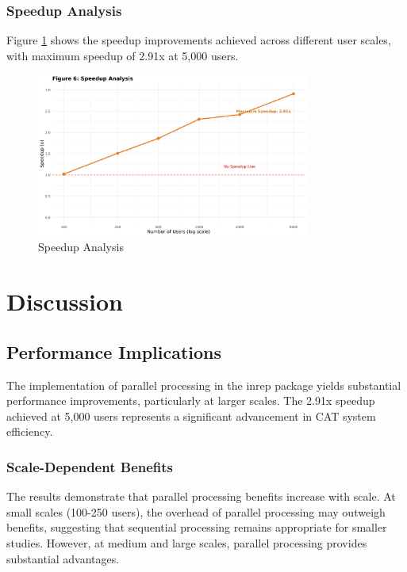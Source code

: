 \documentclass[11pt]{article}
\begin{document}
\subsubsection{Speedup Analysis}

Figure \ref{fig:speedup} shows the speedup improvements achieved across different user scales, with maximum speedup of 2.91x at 5,000 users.

\begin{figure}[H]
\centering
\includegraphics[width=0.8\textwidth]{Figure6_Speedup_Analysis.png}
\caption{Speedup Analysis}
\label{fig:speedup}
\end{figure}

\section{Discussion}

\subsection{Performance Implications}

The implementation of parallel processing in the inrep package yields substantial performance improvements, particularly at larger scales. The 2.91x speedup achieved at 5,000 users represents a significant advancement in CAT system efficiency.

\subsubsection{Scale-Dependent Benefits}

The results demonstrate that parallel processing benefits increase with scale. At small scales (100-250 users), the overhead of parallel processing may outweigh benefits, suggesting that sequential processing remains appropriate for smaller studies. However, at medium and large scales, parallel processing provides substantial advantages.
\end{document}
